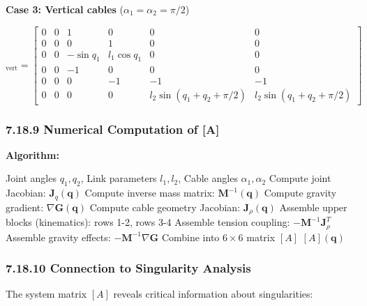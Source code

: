 \textbf{Case 3: Vertical cables} ($\alpha_1 = \alpha_2 = \pi/2$)

\begin{equation}
[A]_{\text{vert}} = \begin{bmatrix}
0 & 0 & 1 & 0 & 0 & 0 \\
0 & 0 & 0 & 1 & 0 & 0 \\
0 & 0 & -\sin q_1 & l_1 \cos q_1 & 0 & 0 \\
0 & 0 & -1 & 0 & 0 & 0 \\
0 & 0 & 0 & -1 & -1 & -1 \\
0 & 0 & 0 & 0 & l_2 \sin(q_1+q_2+\pi/2) & l_2 \sin(q_1+q_2+\pi/2)
\end{bmatrix}
\end{equation}

\subsubsection{7.18.9 Numerical Computation of [A]}

\textbf{Algorithm:}

\begin{algorithm}[H]
\caption{Compute System Matrix [A] at Configuration $\mathbf{q}$}
\begin{algorithmic}[1]
\REQUIRE Joint angles $q_1, q_2$, Link parameters $l_1, l_2$, Cable angles $\alpha_1, \alpha_2$
\STATE Compute joint Jacobian: $\mathbf{J}_q(\mathbf{q})$
\STATE Compute inverse mass matrix: $\mathbf{M}^{-1}(\mathbf{q})$
\STATE Compute gravity gradient: $\nabla \mathbf{G}(\mathbf{q})$
\STATE Compute cable geometry Jacobian: $\mathbf{J}_{\rho}(\mathbf{q})$
\STATE Assemble upper blocks (kinematics): rows 1-2, rows 3-4
\STATE Assemble tension coupling: $-\mathbf{M}^{-1} \mathbf{J}_{\rho}^T$
\STATE Assemble gravity effects: $-\mathbf{M}^{-1} \nabla \mathbf{G}$
\STATE Combine into $6 \times 6$ matrix $[A]$
\RETURN $[A](\mathbf{q})$
\end{algorithmic}
\end{algorithm}

\subsubsection{7.18.10 Connection to Singularity Analysis}

The system matrix $[A]$ reveals critical information about singularities:

